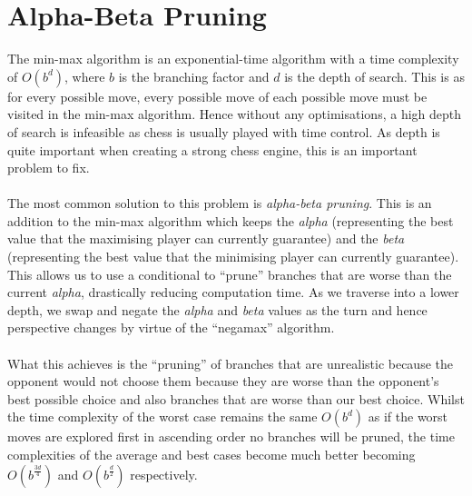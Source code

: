\section{Alpha-Beta Pruning}
The min-max algorithm is an exponential-time algorithm with a time complexity of $O(b^d)$, where $b$ is the branching factor and $d$ is the depth of search. This is as for every possible move, every possible move of each possible move must be visited in the min-max algorithm. Hence without any optimisations, a high depth of search is infeasible as chess is usually played with time control. As depth is quite important when creating a strong chess engine, this is an important problem to fix.\\\\
The most common solution to this problem is \textit{alpha-beta pruning}. This is an addition to the min-max algorithm which keeps the \textit{alpha} (representing the best value that the maximising player can currently guarantee) and the \textit{beta} (representing the best value that the minimising player can currently guarantee). This allows us to use a conditional to ``prune'' branches that are worse than the current \textit{alpha}, drastically reducing computation time. As we traverse into a lower depth, we swap and negate the \textit{alpha} and \textit{beta} values as the turn and hence perspective changes by virtue of the ``negamax'' algorithm.\\\\
What this achieves is the ``pruning'' of branches that are unrealistic because the opponent would not choose them because they are worse than the opponent's best possible choice and also branches that are worse than our best choice. Whilst the time complexity of the worst case remains the same $O(b^d)$ as if the worst moves are explored first in ascending order no branches will be pruned, the time complexities of the average and best cases become much better becoming $O(b^{\frac{3d}{4}})$ and $O(b^{\frac{d}{2}})$ respectively. 
